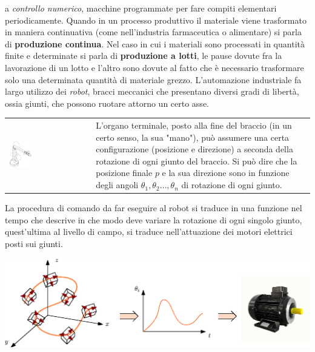 \documentclass[10pt, letterpaper]{report}
\begin{document}
a \textit{controllo numerico}, macchine programmate per fare compiti elementari periodicamente. \acc 
Quando in un processo produttivo il materiale viene trasformato in maniera continuativa (come nell'industria 
farmaceutica o alimentare) si parla di \textbf{produzione continua}. Nel caso in cui i materiali sono processati 
in quantità finite e determinate si parla di \textbf{produzione a lotti}, le pause dovute fra la lavorazione di un lotto 
e l'altro sono dovute al fatto 
che è necessario trasformare solo una determinata quantità di materiale grezzo.\acc 
L'automazione industriale fa largo utilizzo dei \textit{robot}, bracci meccanici che presentano diversi 
gradi di libertà, ossia giunti, che possono ruotare attorno un certo asse. 
   \begin{center}
	\begin{tabular}{>{\centering\arraybackslash}m{3in}>{\arraybackslash}m{3in}}
        \includegraphics[width=0.3\textwidth ]{images/braccioRobot.pdf} & L'organo terminale, posto alla fine 
        del braccio (in un certo senso, la sua "mano"), può assumere una certa configurazione (posizione e direzione) a 
        seconda della rotazione di ogni giunto del braccio. 
        Si può dire che la posizione finale $p$ e la sua direzione sono in funzione degli angoli 
        $\theta_1,\theta_2\dots,\theta_n$ di rotazione di ogni giunto.
		\\
	\end{tabular}
\end{center}
La procedura di comando da far eseguire al robot si traduce in una funzione nel tempo che descrive in che modo 
deve variare la rotazione di ogni singolo giunto, quest'ultima al livello di campo, si traduce nell'attuazione 
dei motori elettrici posti sui giunti.
\begin{center}
        \includegraphics[width=1\textwidth ]{images/rotBraccioRobot.eps}
\end{center}
\end{document}

